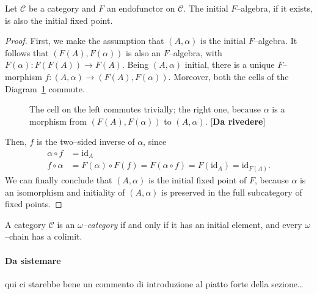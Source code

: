 \begin{lem}
  Let \(\mathcal{C}\) be a category and \(F\) an endofunctor on \(\mathcal{C}\).
  The initial \(F\)--algebra, if it exists, is also the initial fixed point.
\end{lem}
\begin{proof}
  First, we make the assumption that \((A,\alpha)\) is the initial \(F\)--algebra. It follows that \((F(A),F(\alpha))\) is also an \(F\)--algebra, with \(F(\alpha) \colon F(F(A)) \to F(A)\).
  Being \((A,\alpha)\) initial, there is a unique \(F\)--morphism \(f \colon (A,\alpha) \to (F(A),F(\alpha))\). Moreover, both the cells of the Diagram~\ref{02:dia-1} commute.
  \begin{figure}[!ht]
    \begin{center}
    \end{center}
    \caption{The cell on the left commutes trivially; the right one, because \(\alpha\) is a morphism from \((F(A),F(\alpha))\) to \((A,\alpha)\). [\textbf{Da rivedere}]}
    \label{02:dia-1}
  \end{figure}

  Then, \(f\) is the two--sided inverse of \(\alpha\), since
  \begin{align*}
    \alpha \circ f &= \mathrm{id}_A \\
    f \circ \alpha &= F(\alpha) \circ F(f) = F (\alpha \circ f) = F(\mathrm{id}_A) = \mathrm{id}_{F(A)}.
  \end{align*}
  We can finally conclude that \((A,\alpha)\) is the initial fixed point of \(F\), because \(\alpha\) is an isomorphism and initiality of \((A,\alpha)\) is preserved in the full subcategory of fixed points.
\end{proof}

\begin{dfn}
  A category \(\mathcal{C}\) is an \emph{\(\omega\)--category} if and only if it has an initial element, and every \(\omega\)--chain has a colimit.
\end{dfn}

\paragraph{Da sistemare} qui ci starebbe bene un commento di introduzione al piatto forte della sezione\dots

